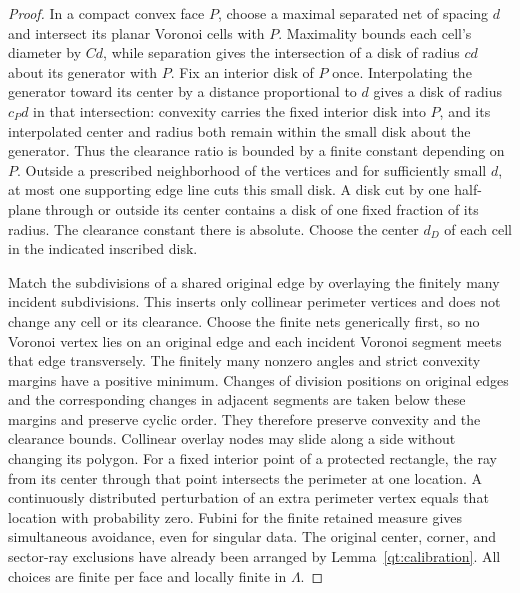 \begin{proof}
In a compact convex face $P$, choose a maximal separated net of spacing
$d$ and intersect its planar Voronoi cells with $P$.  Maximality bounds
each cell's diameter by $C d$, while separation gives the intersection
of a disk of radius $c d$ about its generator with $P$.  Fix an interior
disk of $P$ once.  Interpolating the generator toward its center by a
distance proportional to $d$ gives a disk of radius $c_Pd$ in that
intersection: convexity carries the fixed interior disk into $P$, and
its interpolated center and radius both remain within the small disk
about the generator.  Thus the clearance ratio is bounded by a finite
constant depending on $P$.  Outside a prescribed neighborhood of the
vertices and for sufficiently small $d$, at most one supporting edge
line cuts this small disk.  A disk cut by one half-plane through or
outside its center contains a disk of one fixed fraction of its radius.
The clearance constant there is absolute.  Choose the center $d_D$
of each cell in the indicated inscribed disk.

Match the subdivisions of a shared original edge by overlaying the
finitely many incident subdivisions.  This inserts only collinear
perimeter vertices and does not change any cell or its clearance.
Choose the finite nets generically first, so no Voronoi vertex lies
on an original edge and each incident Voronoi segment meets that edge
transversely.  The finitely many nonzero angles and strict convexity
margins have a positive minimum.  Changes of division positions on
original edges and the corresponding changes in adjacent segments
are taken below these margins and preserve cyclic order.  They
therefore preserve convexity and the clearance bounds.  Collinear
overlay nodes may slide along a side without changing its polygon.  For a fixed interior point of a
protected rectangle, the ray from its center through that point
intersects the perimeter at one location.  A continuously distributed
perturbation of an extra perimeter vertex equals that location with
probability zero.  Fubini for the finite retained measure gives
simultaneous avoidance, even for singular data.  The original center,
corner, and sector-ray exclusions have already been arranged by
Lemma~\ref{qt:calibration}.  All choices are finite per face and locally
finite in $\Lambda$.


\end{proof}
